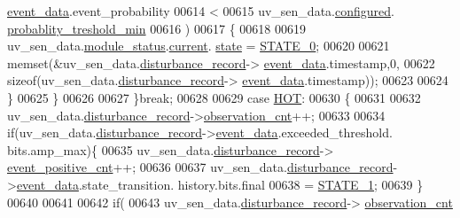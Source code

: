\begin{DoxyCode}
      \hyperlink{a00028_a8c0bda69e71ef674e60da47ad0be9ab0}{event\_data}.event\_probability
00614                             <
00615                            uv\_sen\_data.\hyperlink{a00035_a94b2d1f6ea4ab334c74d24984dd27843}{configured}.
      \hyperlink{a00021_aa59261f74183d4f9e909ac425e0bea35}{probablity\_treshold\_min}
00616                            )
00617                          \{
00618 
00619                              uv\_sen\_data.\hyperlink{a00035_a5a53c391562b059eb744ac679f3765ca}{module\_status}.\hyperlink{a00017_ab8af48cdbba92b3ae39c4470e53af944}{current}.
      \hyperlink{a00017_a6b8d8e916bc56265a3fd279bd26b6d1b}{state} = \hyperlink{a00021_ad6739dbbe5581cac99b7dc8a5e09949c}{STATE\_0};
00620 
00621                              memset(&uv\_sen\_data.\hyperlink{a00035_ac9b38e2c1d3f1013a88d33506c754152}{disturbance\_record}->
      \hyperlink{a00028_a8c0bda69e71ef674e60da47ad0be9ab0}{event\_data}.timestamp,0,
00622                                      \textcolor{keyword}{sizeof}(uv\_sen\_data.\hyperlink{a00035_ac9b38e2c1d3f1013a88d33506c754152}{disturbance\_record}->
      \hyperlink{a00028_a8c0bda69e71ef674e60da47ad0be9ab0}{event\_data}.timestamp));
00623 
00624                         \}
00625              \}
00626 
00627         \}\textcolor{keywordflow}{break};
00628 
00629         \textcolor{keywordflow}{case} \hyperlink{a00021_a1eb14cc432874ddacd1934791dbe12a3}{HOT}:
00630         \{
00631 
00632              uv\_sen\_data.\hyperlink{a00035_ac9b38e2c1d3f1013a88d33506c754152}{disturbance\_record}->\hyperlink{a00028_ad5b0bac02ce266b91b2b52a1c3ea1d78}{observation\_cnt}++;
00633 
00634             \textcolor{keywordflow}{if}(uv\_sen\_data.\hyperlink{a00035_ac9b38e2c1d3f1013a88d33506c754152}{disturbance\_record}->\hyperlink{a00028_a8c0bda69e71ef674e60da47ad0be9ab0}{event\_data}.exceeded\_threshold.
      bits.amp\_max)\{
00635                  uv\_sen\_data.\hyperlink{a00035_ac9b38e2c1d3f1013a88d33506c754152}{disturbance\_record}->
      \hyperlink{a00028_a7397b9d76d4b57500f27bb23d258a18a}{event\_positive\_cnt}++;
00636 
00637                 uv\_sen\_data.\hyperlink{a00035_ac9b38e2c1d3f1013a88d33506c754152}{disturbance\_record}->\hyperlink{a00028_a8c0bda69e71ef674e60da47ad0be9ab0}{event\_data}.state\_transition.
      history.bits.final
00638                 = \hyperlink{a00021_a727351838367f27ac0adb9a13422c342}{STATE\_1};
00639             \}
00640 
00641 
00642              \textcolor{keywordflow}{if}(
00643                   uv\_sen\_data.\hyperlink{a00035_ac9b38e2c1d3f1013a88d33506c754152}{disturbance\_record}->
      \hyperlink{a00028_ad5b0bac02ce266b91b2b52a1c3ea1d78}{observation\_cnt}

\end{DoxyCode}
